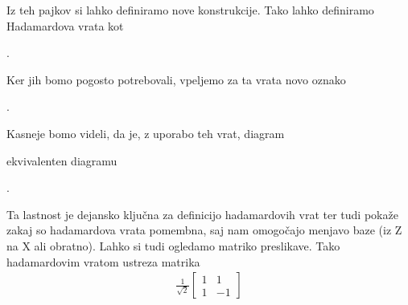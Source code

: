 \documentclass[mat1]{fmfdelo}
\begin{document}
Iz teh pajkov si lahko definiramo nove konstrukcije. Tako lahko definiramo Hadamardova vrata kot
\begin{center}
    .
\end{center}
Ker jih bomo pogosto potrebovali, vpeljemo za ta vrata novo oznako
\begin{center}
    .
\end{center}
Kasneje bomo videli, da je, z uporabo teh vrat, diagram
\begin{center}
\end{center}
ekvivalenten diagramu
\begin{center}
    .
\end{center}
Ta lastnost je dejansko ključna za definicijo hadamardovih vrat ter tudi pokaže zakaj so hadamardova vrata pomembna, saj nam omogočajo menjavo baze (iz Z na X ali obratno). Lahko si tudi ogledamo matriko preslikave. Tako hadamardovim vratom ustreza matrika
\begin{align*}
    \frac{1}{\sqrt2}\begin{bmatrix}
        1&1\\
        1&-1
    \end{bmatrix}
\end{align*}
\end{document}
